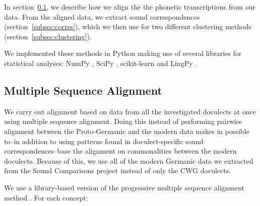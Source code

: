 \documentclass[a4paper]{article}
\begin{document}
In section~\ref{subsec:msa}, we describe how we align
the the phonetic transcriptions from our data.
From the aligned data, we extract sound correspondences
(section~\ref{subsec:corres}), which we then use for
two different clustering methods (section~\ref{subsec:clustering}).

We implemented these methods in Python
making use of several libraries for statistical analyses:
NumPy \citep{oliphant2006guide}, SciPy \citep{jones2001scipy},
scikit-learn \citep{pedregosa2011scikit-learn} and LingPy \citep{list2018lingpy}.

\subsection{Multiple Sequence Alignment}
\label{subsec:msa}


We carry out alignment based on data from
all the investigated doculects at once using multiple sequence alignment.
Doing this instead of performing pairwise alignment between
the Proto-Germanic and the modern data makes in possible
to--in addition to using patterns found in doculect-specific
sound correspondences--base the alignment on commonalities
between the modern doculects.
Because of this, we use all of the modern Germanic data
we extracted from the Sound Comparisons project
instead of only the CWG doculects.

We use a library-based version \citep{notredame2000t-coffee:} of the progressive multiple sequence alignment method \citep{thompson1994clustal}.
For each concept:
\end{document}
